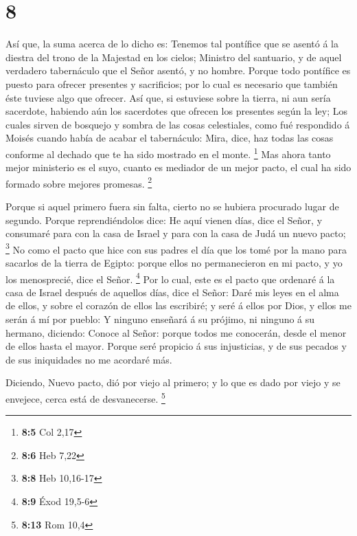 \hypertarget{section-7}{%
\section{8}\label{section-7}}

 Así que, la suma acerca de lo dicho es: Tenemos tal
pontífice que se asentó á la diestra del trono de la Majestad en los
cielos;  Ministro del santuario, y de aquel verdadero
tabernáculo que el Señor asentó, y no hombre.  Porque todo
pontífice es puesto para ofrecer presentes y sacrificios; por lo cual es
necesario que también éste tuviese algo que ofrecer.  Así
que, si estuviese sobre la tierra, ni aun sería sacerdote, habiendo aún
los sacerdotes que ofrecen los presentes según la ley; 
Los cuales sirven de bosquejo y sombra de las cosas celestiales, como
fué respondido á Moisés cuando había de acabar el tabernáculo: Mira,
dice, haz todas las cosas conforme al dechado que te ha sido mostrado en
el monte. \footnote{\textbf{8:5} Col 2,17}  Mas ahora
tanto mejor ministerio es el suyo, cuanto es mediador de un mejor pacto,
el cual ha sido formado sobre mejores promesas. \footnote{\textbf{8:6}
  Heb 7,22}

 Porque si aquel primero fuera sin falta, cierto no se
hubiera procurado lugar de segundo.  Porque
reprendiéndolos dice: He aquí vienen días, dice el Señor, y consumaré
para con la casa de Israel y para con la casa de Judá un nuevo pacto;
\footnote{\textbf{8:8} Heb 10,16-17}  No como el pacto que
hice con sus padres el día que los tomé por la mano para sacarlos de la
tierra de Egipto: porque ellos no permanecieron en mi pacto, y yo los
menosprecié, dice el Señor. \footnote{\textbf{8:9} Éxod 19,5-6}
 Por lo cual, este es el pacto que ordenaré á la casa de
Israel después de aquellos días, dice el Señor: Daré mis leyes en el
alma de ellos, y sobre el corazón de ellos las escribiré; y seré á ellos
por Dios, y ellos me serán á mí por pueblo:  Y ninguno
enseñará á su prójimo, ni ninguno á su hermano, diciendo: Conoce al
Señor: porque todos me conocerán, desde el menor de ellos hasta el
mayor.  Porque seré propicio á sus injusticias, y de sus
pecados y de sus iniquidades no me acordaré más.

 Diciendo, Nuevo pacto, dió por viejo al primero; y lo
que es dado por viejo y se envejece, cerca está de desvanecerse.
\footnote{\textbf{8:13} Rom 10,4}

